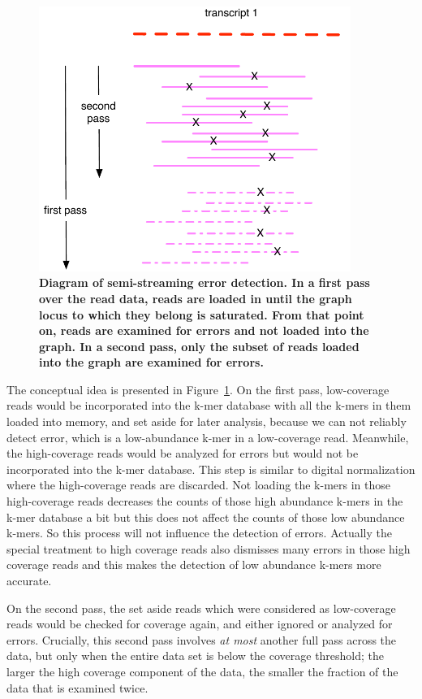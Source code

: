 \begin{figure}[!ht]
 \centerline{\includegraphics[width=4in]{./figures/graph-saturation}}
\caption{\bf Diagram of semi-streaming error detection. In a first pass
over the read data, reads are loaded in until the graph locus to which
they belong is saturated.  From that point on, reads are examined for
errors and not loaded into the graph.  In a second pass, only the subset
of reads loaded into the graph are examined for errors.}
\label{fig:concept}
\end{figure}

The conceptual idea is presented in Figure~\ref{fig:concept}.  On the
first pass, low-coverage reads would be incorporated into the k-mer
database with all the k-mers in them loaded into memory, and set aside for later analysis, because we can not reliably detect error, which 
is a low-abundance k-mer in a low-coverage read. 
Meanwhile, the high-coverage reads
would be analyzed for errors but would not be incorporated into the k-mer database.
This step is similar to digital normalization where the high-coverage reads are
discarded. Not loading the k-mers in those high-coverage reads decreases the
counts of those high abundance k-mers in the k-mer database a bit but this
does not affect the counts of those low abundance k-mers. So this process will
not influence the detection of errors. 
Actually the special treatment to high coverage reads also dismisses many errors in
those high coverage reads 
and this makes the detection of low abundance k-mers more accurate.

On the second pass, the set aside reads which were considered as low-coverage reads
would be checked for coverage again, and either ignored or analyzed
for errors.  Crucially, this second pass involves {\em at most}
another full pass across the data, but only when the entire data set
is below the coverage threshold; the larger the high coverage
component of the data, the smaller the fraction of the data that is
examined twice.


